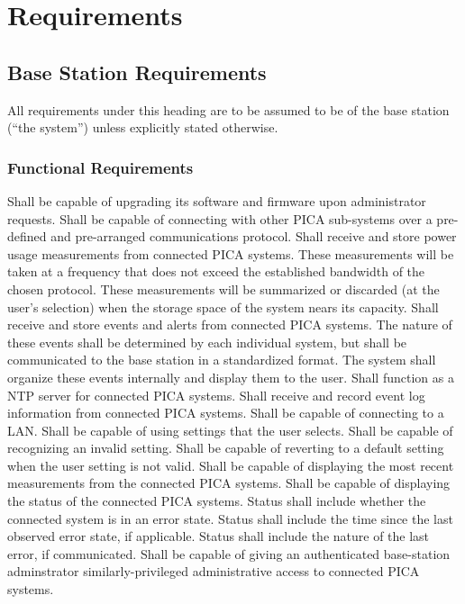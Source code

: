 \section{Requirements}

\subsection{Base Station Requirements}\label{sec:base_station_reqs}
All requirements under this heading are to be assumed to be of the base station (``the system'') unless explicitly stated otherwise.

\subsubsection{Functional Requirements}
\begin{outline}[enumerate]
\1 Shall be capable of upgrading its software and firmware upon administrator requests.
\1 Shall be capable of connecting with other PICA sub-systems over a pre-defined and pre-arranged communications protocol.
 \2 Shall receive and store power usage measurements from connected PICA systems.
  \3 These measurements will be taken at a frequency that does not exceed the established bandwidth of the chosen protocol.
  \3 These measurements will be summarized or discarded (at the user's selection) when the storage space of the system nears its capacity.
 \2 Shall receive and store events and alerts from connected PICA systems.
  \3 The nature of these events shall be determined by each individual system, but shall be communicated to the base station in a standardized format.
  \3 The system shall organize these events internally and display them to the user.
 \2 Shall function as a \ac{NTP} server for connected PICA systems.
 \2 Shall receive and record event log information from connected PICA systems.
\1 Shall be capable of connecting to a \ac{LAN}.
\1 Shall be capable of using settings that the user selects.
 \2 Shall be capable of recognizing an invalid setting.
 \2 Shall be capable of reverting to a default setting when the user setting is not valid.
\1 Shall be capable of displaying the most recent measurements from the connected PICA systems.
\1 Shall be capable of displaying the status of the connected PICA systems.
 \2 Status shall include whether the connected system is in an error state.
 \2 Status shall include the time since the last observed error state, if applicable.
 \2 Status shall include the nature of the last error, if communicated.
\1 Shall be capable of giving an authenticated base-station adminstrator similarly-privileged administrative access to connected PICA systems.

\end{outline}
